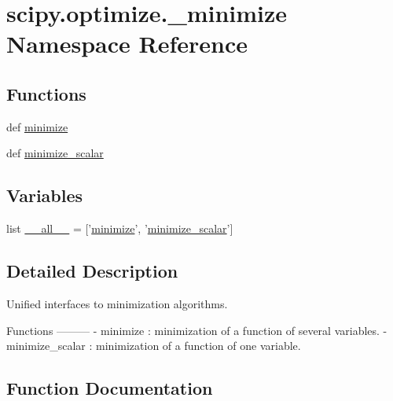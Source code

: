 \hypertarget{namespacescipy_1_1optimize_1_1__minimize}{}\section{scipy.\+optimize.\+\_\+minimize Namespace Reference}
\label{namespacescipy_1_1optimize_1_1__minimize}
\subsection*{Functions}
\begin{DoxyCompactItemize}
\item 
def \hyperlink{namespacescipy_1_1optimize_1_1__minimize_a3179e5a734d4098ac383fc1def8ce0d3}{minimize}
\item 
def \hyperlink{namespacescipy_1_1optimize_1_1__minimize_a60ede66cb5e138f729a9ea84348e2944}{minimize\+\_\+scalar}
\end{DoxyCompactItemize}
\subsection*{Variables}
\begin{DoxyCompactItemize}
\item 
list \hyperlink{namespacescipy_1_1optimize_1_1__minimize_ad539d868b0fc31d21322a15a52e9652b}{\+\_\+\+\_\+all\+\_\+\+\_\+} = \mbox{[}'\hyperlink{namespacescipy_1_1optimize_1_1__minimize_a3179e5a734d4098ac383fc1def8ce0d3}{minimize}', '\hyperlink{namespacescipy_1_1optimize_1_1__minimize_a60ede66cb5e138f729a9ea84348e2944}{minimize\+\_\+scalar}'\mbox{]}
\end{DoxyCompactItemize}


\subsection{Detailed Description}
\begin{DoxyVerb}Unified interfaces to minimization algorithms.

Functions
---------
- minimize : minimization of a function of several variables.
- minimize_scalar : minimization of a function of one variable.
\end{DoxyVerb}
 

\subsection{Function Documentation}
\hypertarget{namespacescipy_1_1optimize_1_1__minimize_a3179e5a734d4098ac383fc1def8ce0d3}{}
